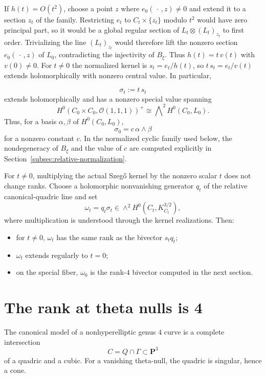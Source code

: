\documentclass[11pt]{article}
\newcommand{\OO}{\mathcal O}
\begin{document}
If $h(t)=O(t^2)$, choose a point $z$ where
$e_0(\,\cdot\,,z)\neq0$ and extend it to a section $z_t$ of the family.
Restricting $e_t$ to $C_t\times\{z_t\}$ modulo $t^2$ would have
zero principal part, so it would be a global regular section of
$L_t\otimes(L_t)_{z_t}$ to first order. Trivializing the line
$(L_t)_{z_t}$ would therefore lift the nonzero section
$e_0(\,\cdot\,,z)$ of $L_0$, contradicting the injectivity of $B_\xi$.
Thus $h(t)=t\,v(t)$ with $v(0)\neq0$. For $t\neq0$ the normalized
kernel is $s_t=e_t/h(t)$, so $t\,s_t=e_t/v(t)$ extends holomorphically
with nonzero central value. In particular,
\endgroup

\[
\sigma_t:=t\,s_t
\]
extends holomorphically and has a nonzero special value spanning
\[
{H^0(C_0\times C_0,\OO(1,1,1))^+}
\cong \bigwedge\nolimits^2H^0(C_0,L_0).
\]
Thus, for a basis $\alpha,\beta$ of $H^0(C_0,L_0)$,
\begin{equation}
\label{eq:sigma-zero-general-c}
\sigma_0=c\,\alpha\wedge\beta
\end{equation}
for a nonzero constant $c$.  In the normalized cyclic family used below,
the nondegeneracy of $B_\xi$ and the value of $c$ are computed explicitly
in Section~\ref{subsec:relative-normalization}.


For $t\neq 0$, multiplying the actual Szeg\H{o} kernel by the nonzero scalar $t$ does not change ranks.
{Choose a holomorphic nonvanishing generator $q_t$ of the relative
canonical-quadric line and set}
\[
{\omega_t=q_t\sigma_t\in\wedge^2H^0(C_t,K_{C_t}^{3/2}),}
\]
{where multiplication is understood through the kernel realizations.} Then:
\begin{itemize}[leftmargin=2em]
\item for $t\neq 0$, \(\omega_t\) has the same rank as {the bivector $s_tq_t$;}
\item \(\omega_t\) extends regularly to \(t=0\);
\item on the special fiber, \(\omega_0\) is the rank-$4$ bivector computed in the next section.
\end{itemize}

\section{The rank at theta nulls is 4}

The canonical model of a nonhyperelliptic genus $4$ curve is a complete intersection
\[
C=Q\cap \Gamma \subset \mathbf P^3
\]
of a quadric and a cubic. For a vanishing theta-null, the quadric is singular, hence a cone.
\end{document}
